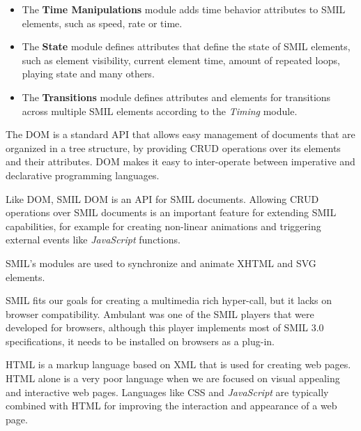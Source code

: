 \begin{itemize}
  \item The \textbf{Time Manipulations} module adds time behavior attributes to \ac{SMIL} elements, such as speed, rate or time.

  \item The \textbf{State} module defines attributes that define the state of \ac{SMIL} elements, such as element visibility, current element time, amount of repeated loops, playing state and many others.

  \item The \textbf{Transitions} module defines attributes and elements for transitions across multiple \ac{SMIL} elements according to the \emph{Timing} module.

\end{itemize}

The \ac{DOM} is a standard \ac{API} that allows easy management of documents that are organized in a tree structure, by providing \ac{CRUD} operations over its elements and their attributes. \ac{DOM} makes it easy to inter-operate between imperative and declarative programming languages.

Like \ac{DOM}, \ac{SMIL} \ac{DOM} is an \ac{API} for \ac{SMIL} documents. Allowing \ac{CRUD} operations over \ac{SMIL} documents is an important feature for extending \ac{SMIL} capabilities, for example for creating non-linear animations and triggering external events like \emph{JavaScript} functions.  


  \ac{SMIL}'s modules are used to synchronize and animate \ac{XHTML} and \ac{SVG} elements.
  
  \ac{SMIL} fits our goals for creating a multimedia rich hyper-call, but it lacks on browser compatibility. Ambulant \cite{ambulant} was one of the SMIL players that were developed for browsers, although this player implements most of \ac{SMIL} 3.0 \cite{smil3} specifications, it needs to be installed on browsers as a plug-in.

  \ac{HTML} is a markup language based on \ac{XML} that is used for creating web pages. \ac{HTML} alone is a very poor language when we are focused on visual appealing and interactive web pages. Languages like \ac{CSS} and \emph{JavaScript} are typically combined with \ac{HTML} for improving the interaction and appearance of a web page. 

